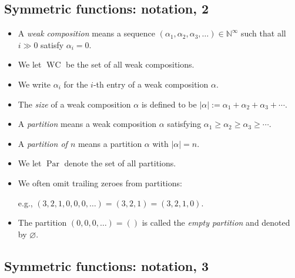 \documentclass[numbers=enddot,12pt,final,onecolumn,notitlepage]{scrartcl}%
\newcommand{\defn}[1]{{\color{darkred}\emph{#1}}}
\newcommand{\0}{\phantom{c}}
\begin{document}
\subsection{Symmetric functions: notation, 2}

\begin{itemize}
\item A \defn{weak composition} means a sequence $\left(  \alpha_{1}%
,\alpha_{2},\alpha_{3},\ldots\right)  \in\mathbb{N}^{\infty}$ such that all
$i\gg0$ satisfy $\alpha_{i}=0$.

\item We let \defn{$\operatorname*{WC}$} be the set of all weak compositions.

\item We write \defn{$\alpha_{i}$} for the $i$-th entry of a weak composition
$\alpha$.

\item The \defn{size} of a weak composition $\alpha$ is defined to be
$\left\vert \alpha\right\vert :=\alpha_{1}+\alpha_{2}+\alpha_{3}+\cdots$.

\item A \defn{partition} means a weak composition $\alpha$ satisfying
$\alpha_{1}\geq\alpha_{2}\geq\alpha_{3}\geq\cdots$.

\item A \defn{partition of $n$} means a partition $\alpha$ with $\left\vert
\alpha\right\vert =n$.

\item We let \defn{$\operatorname*{Par}$} denote the set of all partitions.


\item We often omit trailing zeroes from partitions:

e.g., $\left(  3,2,1,0,0,0,\ldots\right)  =\left(  3,2,1\right)  =\left(
3,2,1,0\right)  $.

\item The partition $\left(  0,0,0,\ldots\right)  =\left(  {}\right)  $ is
called the \defn{empty partition} and denoted by \defn{$\varnothing$}.
\end{itemize}

\subsection{Symmetric functions: notation, 3}
\end{document}

